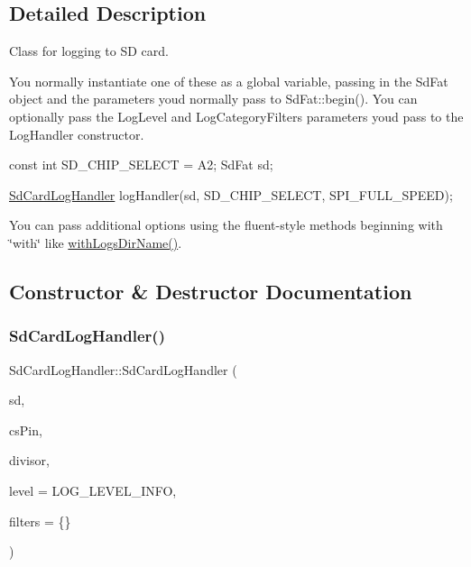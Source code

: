 \subsection{Detailed Description}
Class for logging to SD card. 

You normally instantiate one of these as a global variable, passing in the Sd\+Fat object and the parameters you\textquotesingle{}d normally pass to Sd\+Fat\+::begin(). You can optionally pass the Log\+Level and Log\+Category\+Filters parameters you\textquotesingle{}d pass to the Log\+Handler constructor.


\begin{DoxyCode}
\textcolor{keyword}{const} \textcolor{keywordtype}{int} SD\_CHIP\_SELECT = A2;
SdFat sd;

\mbox{\hyperlink{class_sd_card_log_handler}{SdCardLogHandler}} logHandler(sd, SD\_CHIP\_SELECT, SPI\_FULL\_SPEED);
\end{DoxyCode}


You can pass additional options using the fluent-\/style methods beginning with \char`\"{}with\char`\"{} like \mbox{\hyperlink{class_sd_card_print_handler_aac9a7f9d1a22db39acfc17c4a61c9419}{with\+Logs\+Dir\+Name()}}. 

\subsection{Constructor \& Destructor Documentation}
\mbox{\label{class_sd_card_log_handler_a307fc19ae158016fa223b245210a050c}} 
\subsubsection{\texorpdfstring{Sd\+Card\+Log\+Handler()}{SdCardLogHandler()}}
{\footnotesize\ttfamily Sd\+Card\+Log\+Handler\+::\+Sd\+Card\+Log\+Handler (\begin{DoxyParamCaption}\item[{Sd\+Fat \&}]{sd,  }\item[{uint8\+\_\+t}]{cs\+Pin,  }\item[{uint8\+\_\+t}]{divisor,  }\item[{Log\+Level}]{level = {\ttfamily LOG\+\_\+LEVEL\+\_\+INFO},  }\item[{Log\+Category\+Filters}]{filters = {\ttfamily \{\}} }\end{DoxyParamCaption})}



